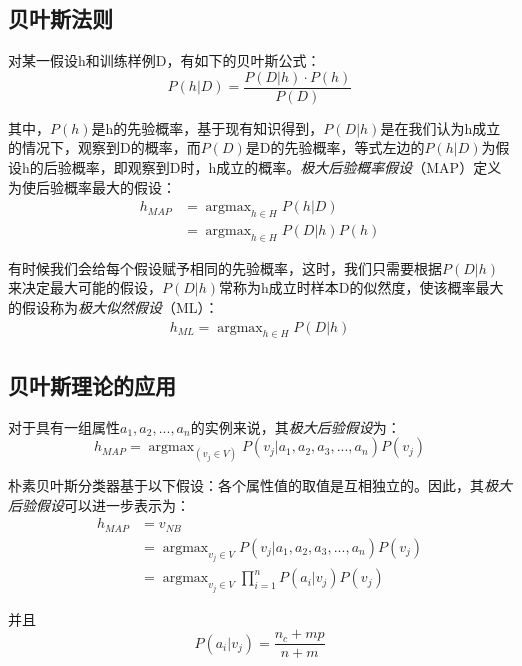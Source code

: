 \documentclass[a4papper]{article}
\begin{document}
\subsection{贝叶斯法则}
\par\setlength{\parindent}{2em} %
对某一假设h和训练样例D，有如下的贝叶斯公式：
\begin{equation*}
  P(h|D) = \frac{P(D|h) \cdot P(h)}{P(D)}
\end{equation*}
\par\setlength{\parindent}{2em} %
其中，$P(h)$是h的先验概率，基于现有知识得到，$P(D|h)$是在我们认为h成立的情况下，观察到D的概率，而$P(D)$是D的先验概率，等式左边的$P(h|D)$为假设h的后验概率，即观察到D时，h成立的概率。\emph{极大后验概率假设}（MAP）定义为使后验概率最大的假设：
\begin{align*}
h_{MAP} & = \mathop{argmax}_{h \in H} P(h|D)\\
& = \mathop{argmax}_{h \in H} P(D|h) P(h)
\end{align*}
\par\setlength{\parindent}{2em}
有时候我们会给每个假设赋予相同的先验概率，这时，我们只需要根据$P(D|h)$来决定最大可能的假设，$P(D|h)$常称为h成立时样本D的似然度，使该概率最大的假设称为\emph{极大似然假设}（ML）：
\begin{align*}
  h_{ML} = \mathop{argmax}_{h \in H} P(D|h)
\end{align*}
\subsection{贝叶斯理论的应用}
\par\setlength{\parindent}{2em}
对于具有一组属性${a_1, a_2, ...,a_n}$的实例来说，其\emph{极大后验假设}为：
\begin{equation*}
  h_{MAP} = \mathop{argmax}_(v_j \in V) P(v_j|a_1, a_2, a_3, ..., a_n)P(v_j)
\end{equation*}
\par\setlength{\parindent}{2em}
朴素贝叶斯分类器基于以下假设：各个属性值的取值是互相独立的。因此，其\emph{极大后验假设}可以进一步表示为：
\begin{align*}
   h_{MAP} & = v_{NB}\\
   & = \mathop{argmax}_{v_j \in V} P(v_j|a_1, a_2, a_3, ..., a_n)P(v_j) \\
   & = \mathop{argmax}_{v_j \in V} \prod _{i = 1} ^n P(a_i|v_j) P(v_j)
\end{align*}
\par\setlength{\parindent}{2em}
并且
\begin{equation*}
  P(a_i|v_j) = \frac{n_c + mp}{n+m}
\end{equation*}
\section{}
\sbusection{}
\par\setlength{\parindent}{2em}
\end{document}
